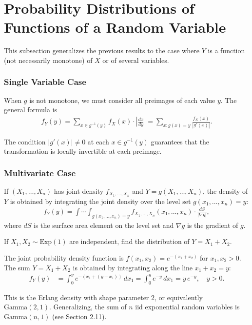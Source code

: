 \section{Probability Distributions of Functions of a Random Variable}

This subsection generalizes the previous results to the case where $Y$ is a function (not necessarily monotone) of $X$ or of several variables.

\subsubsection{Single Variable Case}

When $g$ is not monotone, we must consider all preimages of each value $y$. The general formula is
\begin{align}
 \label{eq:3.2.5}
 f_Y(y) = \sum_{x \in g^{-1}(y)} f_X(x) \cdot \left|\frac{dx}{dy}\right|
 = \sum_{x: g(x) = y} \frac{f_X(x)}{|g'(x)|}.
\end{align}

\begin{observacion}
The condition $|g'(x)| \neq 0$ at each $x \in g^{-1}(y)$ guarantees that the transformation is locally invertible at each preimage.
\end{observacion}

\subsubsection{Multivariate Case}

If $(X_1, \ldots, X_n)$ has joint density $f_{X_1, \ldots, X_n}$ and $Y = g(X_1, \ldots, X_n)$, the density of $Y$ is obtained by integrating the joint density over the level set $g(x_1, \ldots, x_n) = y$:
\begin{align}
 \label{eq:3.2.6}
 f_Y(y) = \int \cdots \int_{g(x_1, \ldots, x_n) = y} f_{X_1, \ldots, X_n}(x_1, \ldots, x_n)
 	\cdot \frac{dS}{|\nabla g|},
\end{align}
where $dS$ is the surface area element on the level set and $\nabla g$ is the gradient of $g$.

\begin{ejemplo}
 \label{exmp:3.2.5}
If $X_1, X_2 \sim \text{Exp}(1)$ are independent, find the distribution of $Y = X_1 + X_2$.
\end{ejemplo}

\begin{solucion}
The joint probability density function is $f(x_1, x_2) = e^{-(x_1+x_2)}$ for $x_1, x_2 > 0$. The sum $Y = X_1 + X_2$ is obtained by integrating along the line $x_1 + x_2 = y$:
\begin{align}
 f_Y(y) &= \int_0^y e^{-(x_1 + (y-x_1))}\,dx_1 = \int_0^y e^{-y}\,dx_1 = y\,e^{-y}, \quad y > 0.
\end{align}

This is the Erlang density with shape parameter $2$, or equivalently $\text{Gamma}(2, 1)$. Generalizing, the sum of $n$ iid exponential random variables is $\text{Gamma}(n, 1)$ (see Section 2.11).
\end{solucion}
